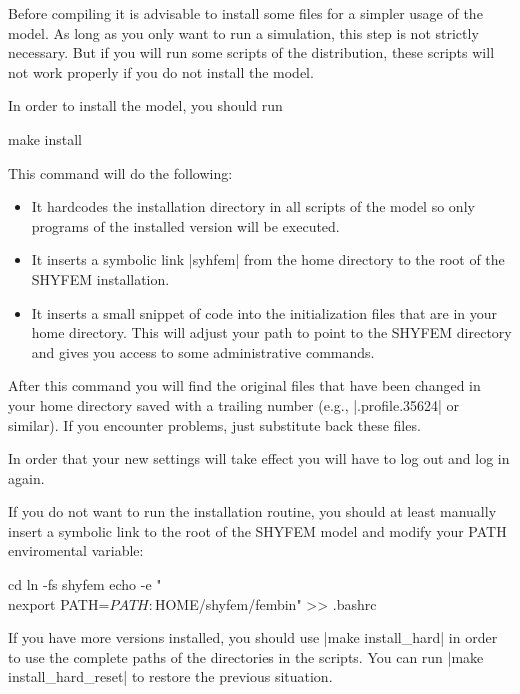 
\newcommand{\sysfiles}{.bashrc .bash\_profile .profile}

Before compiling it is advisable to install some files for a simpler
usage of the model. As long as you only want to run a simulation, this
step is not strictly necessary. But if you will run some scripts of the
distribution, these scripts will not work properly if you do not install
the model.

In order to install the model, you should run

\begin{code}
    make install
\end{code}

This command will do the following:

\begin{itemize}

\item It hardcodes the installation directory in all scripts of the
model so only programs of the installed version will be executed.

\item It inserts a symbolic link |syhfem| from the home directory to
the root of the SHYFEM installation.

\item It inserts a small snippet of code into the initialization files
\ttt{\sysfiles} that are in your home directory. This will adjust your
path to point to the SHYFEM directory and gives you access to some
administrative commands.

\end{itemize}

After this command you will find the original files that have been changed
in your home directory saved with a trailing number (e.g., |.profile.35624|
or similar).  If you encounter problems, just substitute back these files.

In order that your new settings will take effect you will have to log
out and log in again.

If you do not want to run the installation routine, you should at least
manually insert a symbolic link to the root of the SHYFEM model and
modify your PATH enviromental variable:

\begin{codem}
    cd
    ln -fs \shydir shyfem
    echo -e "\\nexport PATH=$PATH:$HOME/shyfem/fembin" >> .bashrc
\end{codem}

If you have more versions installed, you should use |make install_hard|
in order to use the complete paths of the directories in the scripts.
You can run |make install_hard_reset| to restore the previous situation.

